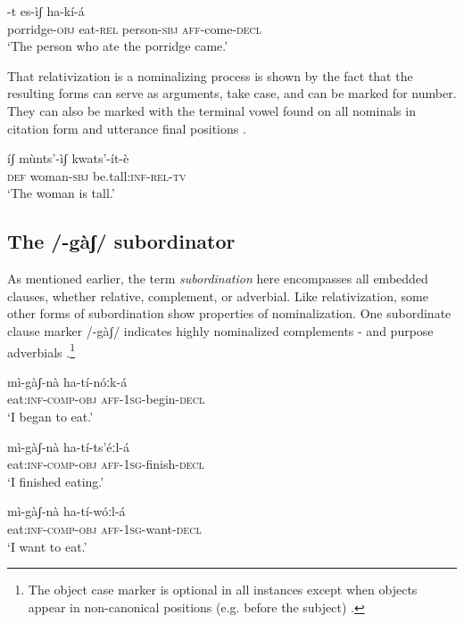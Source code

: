 \documentclass[output=paper]{langsci/langscibook}
\begin{document}
\ea\label{ex:mahland:44}
\gll [kàːl-là           mí]-t     es-ìʃ           ha-kí-{\downstep}á\\
porridge\textsc{{}-obj}   eat\textsc{{}-rel}    person\textsc{{}-sbj}   \textsc{aff}-come\textsc{{}-decl} \\
\glt `The person who ate the porridge came.'
\z

That relativization is a nominalizing process is shown by the fact that the resulting forms can serve as arguments, take case, and can be marked for number. They can also be marked with the terminal vowel found on all nominals in citation form and utterance final positions . 


\ea\label{ex:mahland:45}
\gll íʃ        mùnts'-ìʃ        kwats'-ít-è\\
\textsc{def}      woman-\textsc{sbj}     be.tall\textsc{:inf-rel-tv}\\
`The woman is tall.'
\z

\subsection{The /-gàʃ/ subordinator}\label{sec:mahland:2.3}

As mentioned earlier, the term \textit{subordination} here encompasses all embedded clauses, whether relative, complement, or adverbial. Like relativization, some other forms of subordination show properties of nominalization. One subordinate clause marker /-gàʃ/ indicates highly nominalized complements - and purpose adverbials .\footnote{The object case marker is optional in all instances except when objects appear in non-canonical positions (e.g. before the subject) \citep[327]{Ahland2012}.}


\ea\label{ex:mahland:46}
\gll mì-gàʃ-nà              ha-tí-nóːk-{\downstep}á  \\
eat:\textsc{inf-comp-obj}   \textsc{aff-1sg}{}-begin-\textsc{decl}   \\
\glt `I began to eat.'
\z

\ea\label{ex:mahland:47}
\gll mì-gàʃ-nà              ha-tí-ts'éːl-{\downstep}á  \\
eat:\textsc{inf-comp-obj}   \textsc{aff-1sg}{}-finish-\textsc{decl}   \\
\glt `I finished eating.'
\z

\ea\label{ex:mahland:48}
\gll mì-gàʃ-nà              ha-tí-wóːl-{\downstep}á  \\
eat:\textsc{inf-comp-obj}   \textsc{aff-1sg}{}-want-\textsc{decl}   \\
\glt `I want to eat.'
\z
\end{document}
